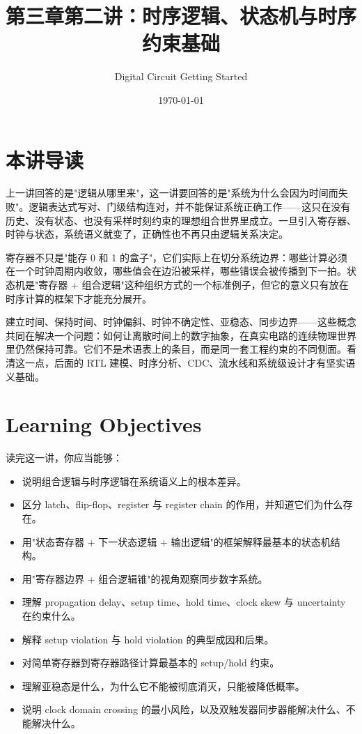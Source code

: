 \documentclass[11pt,a4paper]{article}
\title{第三章第二讲：时序逻辑、状态机与时序约束基础}
\author{Digital Circuit Getting Started}
\date{\today}
\begin{document}
\maketitle

\section{本讲导读}

上一讲回答的是"逻辑从哪里来"，这一讲要回答的是"系统为什么会因为时间而失败"。逻辑表达式写对、门级结构连对，并不能保证系统正确工作——这只在没有历史、没有状态、也没有采样时刻约束的理想组合世界里成立。一旦引入寄存器、时钟与状态，系统语义就变了，正确性也不再只由逻辑关系决定。

寄存器不只是"能存 0 和 1 的盒子"，它们实际上在切分系统边界：哪些计算必须在一个时钟周期内收敛，哪些值会在边沿被采样，哪些错误会被传播到下一拍。状态机是"寄存器 + 组合逻辑"这种组织方式的一个标准例子，但它的意义只有放在时序计算的框架下才能充分展开。

建立时间、保持时间、时钟偏斜、时钟不确定性、亚稳态、同步边界——这些概念共同在解决一个问题：如何让离散时间上的数字抽象，在真实电路的连续物理世界里仍然保持可靠。它们不是术语表上的条目，而是同一套工程约束的不同侧面。看清这一点，后面的 RTL 建模、时序分析、CDC、流水线和系统级设计才有坚实语义基础。

\section{Learning Objectives}

读完这一讲，你应当能够：

\begin{itemize}
  \item 说明组合逻辑与时序逻辑在系统语义上的根本差异。
  \item 区分 latch、flip-flop、register 与 register chain 的作用，并知道它们为什么存在。
  \item 用"状态寄存器 + 下一状态逻辑 + 输出逻辑"的框架解释最基本的状态机结构。
  \item 用"寄存器边界 + 组合逻辑锥"的视角观察同步数字系统。
  \item 理解 propagation delay、setup time、hold time、clock skew 与 uncertainty 在约束什么。
  \item 解释 setup violation 与 hold violation 的典型成因和后果。
  \item 对简单寄存器到寄存器路径计算最基本的 setup/hold 约束。
  \item 理解亚稳态是什么，为什么它不能被彻底消灭，只能被降低概率。
  \item 说明 clock domain crossing 的最小风险，以及双触发器同步器能解决什么、不能解决什么。
\end{itemize}
\end{document}

